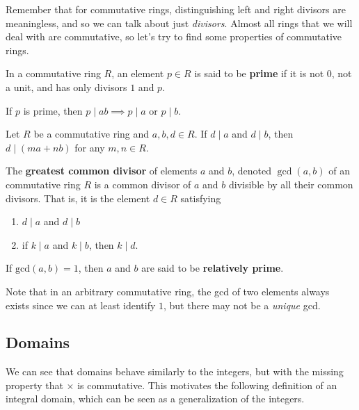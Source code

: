   Remember that for commutative rings, distinguishing left and right divisors are meaningless, and so we can talk about just \textit{divisors}. Almost all rings that we will deal with are commutative, so let's try to find some properties of commutative rings.  

  \begin{definition}
    In a commutative ring $R$, an element $p \in R$ is said to be \textbf{prime} if it is not $0$, not a unit, and has only divisors $1$ and $p$. 
  \end{definition}

  \begin{lemma}[Euclid]
    If $p$ is prime, then $p \mid ab \implies p \mid a$ or $p \mid b$.  
  \end{lemma}

  \begin{lemma} 
    Let $R$ be a commutative ring and $a, b, d \in R$. If $d \mid a$ and $d \mid b$, then $d \mid (ma + nb)$ for any $m, n \in R$. 
  \end{lemma} 

  \begin{definition}
    The \textbf{greatest common divisor} of elements $a$ and $b$, denoted $\gcd(a, b)$ of an commutative ring $R$ is a common divisor of $a$ and $b$ divisible by all their common divisors. That is, it is the element $d \in R$ satisfying 
    \begin{enumerate}
      \item $d \mid a$ and $d \mid b$ 
      \item if $k \mid a$ and $k \mid b$, then $k \mid d$. 
    \end{enumerate}
    If $\mathrm{gcd}(a, b) = 1$, then $a$ and $b$ are said to be \textbf{relatively prime}. 
  \end{definition} 

  Note that in an arbitrary commutative ring, the gcd of two elements always exists since we can at least identify $1$, but there may not be a \textit{unique} gcd. 

\subsection{Domains}

  We can see that domains behave similarly to the integers, but with the missing property that $\times$ is commutative. This motivates the following definition of an integral domain, which can be seen as a generalization of the integers. 

